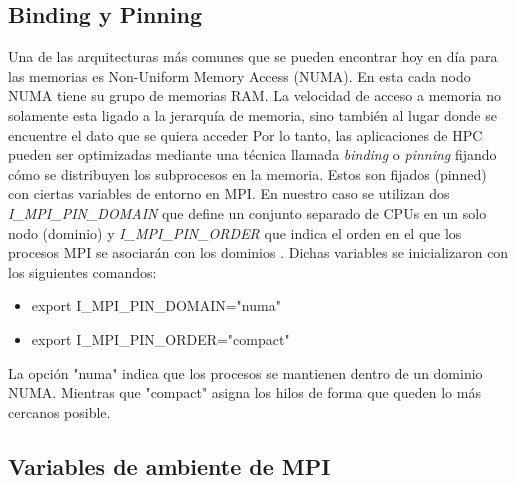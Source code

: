 \subsection{Binding y Pinning}
 Una de las arquitecturas más comunes que se pueden encontrar hoy en día para las memorias es Non-Uniform Memory Access (NUMA). En esta cada nodo NUMA tiene su grupo de memorias RAM. La velocidad de acceso a memoria no solamente esta ligado a la jerarquía de memoria, sino también al lugar donde se encuentre el dato que se quiera acceder \cite{Meta-Volante-0} Por lo tanto, las aplicaciones de HPC pueden ser optimizadas mediante una técnica llamada \textit{binding} o \textit{pinning} fijando cómo se distribuyen los subprocesos en la memoria. Estos son fijados (pinned) con ciertas variables de entorno en MPI. En nuestro caso se utilizan dos \textit{I\_MPI\_PIN\_DOMAIN} que define un conjunto separado de CPUs en un solo nodo (dominio) y \textit{I\_MPI\_PIN\_ORDER} que indica el orden en el que los procesos MPI se asociarán con los dominios \cite{biding-pinning}. Dichas variables se inicializaron con los siguientes comandos:

 \begin{itemize}
 \item export I\_MPI\_PIN\_DOMAIN="numa"
 \item export I\_MPI\_PIN\_ORDER="compact"
 \end{itemize}

La opción "numa" indica que los procesos se mantienen dentro de un dominio NUMA. Mientras que "compact" asigna los hilos de forma que queden lo más cercanos posible.

\subsection{Variables de ambiente de MPI}

